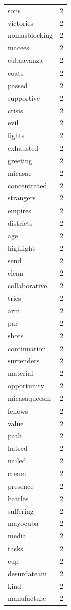 \begin{tabular}{lr}
sons & 2 \\
victories & 2 \\
nomasblocking & 2 \\
macees & 2 \\
cubaavanza & 2 \\
coats & 2 \\
passed & 2 \\
supportive & 2 \\
crisis & 2 \\
evil & 2 \\
lights & 2 \\
exhausted & 2 \\
greeting & 2 \\
micasae & 2 \\
concentrated & 2 \\
strangers & 2 \\
empires & 2 \\
districts & 2 \\
age & 2 \\
highlight & 2 \\
send & 2 \\
clean & 2 \\
collaborative & 2 \\
tries & 2 \\
arm & 2 \\
par & 2 \\
shots & 2 \\
continuation & 2 \\
surrenders & 2 \\
material & 2 \\
opportunity & 2 \\
micasaqueesm & 2 \\
fellows & 2 \\
value & 2 \\
path & 2 \\
hatred & 2 \\
nailed & 2 \\
cream & 2 \\
presence & 2 \\
battles & 2 \\
suffering & 2 \\
mayocuba & 2 \\
media & 2 \\
tasks & 2 \\
cup & 2 \\
desurdateam & 2 \\
kind & 2 \\
manufacture & 2 \\

\end{tabular}
